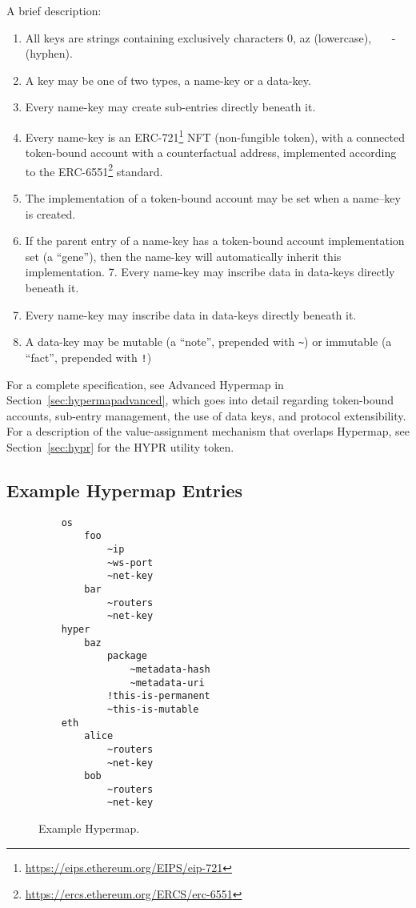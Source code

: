 \documentclass[runningheads]{llncs}
\begin{document}
A brief description:

\begin{enumerate}
    \item All keys are strings containing exclusively characters 0, a\textendash z (lowercase),    - (hyphen).
    \item A key may be one of two types, a name-key or a data-key.
    \item Every name-key may create sub-entries directly beneath it.
    \item Every name-key is an ERC-721\footnote{\url{https://eips.ethereum.org/EIPS/eip-721}} NFT (non-fungible token), with a connected token-bound account with a counterfactual address, implemented according to the ERC-6551\footnote{\url{https://ercs.ethereum.org/ERCS/erc-6551}} standard.
    \item The implementation of a token-bound account may be set when a name–key is created.
    \item If the parent entry of a name-key has a token-bound account implementation set (a ``gene''), then the name-key will automatically inherit this implementation.
    7. Every name-key may inscribe data in data-keys directly beneath it.
    \item Every name-key may inscribe data in data-keys directly beneath it.
    \item A data-key may be mutable (a ``note'', prepended with \verb|~|) or immutable (a ``fact'', prepended with \verb|!|)
\end{enumerate}

For a complete specification, see Advanced Hypermap in Section~\ref{sec:hypermapadvanced}, which goes into detail regarding token-bound accounts, sub-entry management, the use of data keys, and protocol extensibility.
For a description of the value-assignment mechanism that overlaps Hypermap, see Section~\ref{sec:hypr} for the HYPR utility token.

\subsection{Example Hypermap Entries}

\begin{figure}[H]
    \centering
    \begin{verbatim}
    os
        foo
            ~ip
            ~ws-port
            ~net-key
        bar
            ~routers
            ~net-key
    hyper
        baz
            package
                ~metadata-hash
                ~metadata-uri
            !this-is-permanent
            ~this-is-mutable
    eth
        alice
            ~routers
            ~net-key
        bob
            ~routers
            ~net-key
    \end{verbatim}
    \caption{Example Hypermap.}
    \label{fig:example hypermap}
\end{figure}
\end{document}
